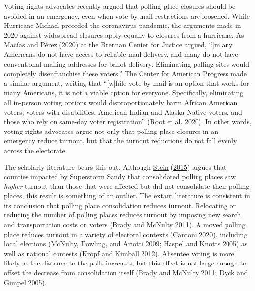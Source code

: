 \documentclass[
  12pt,
]{article}
\begin{document}
Voting rights advocates recently argued that polling place closures should be avoided in an emergency, even when vote-by-mail restrictions are loosened. While Hurricane Michael preceded the coronavirus pandemic, the arguments made in 2020 against widespread closures apply equally to closures from a hurricane. As \protect\hyperlink{ref-Macias2020}{Macías and Pérez} (\protect\hyperlink{ref-Macias2020}{2020}) at the Brennan Center for Justice argued, ``{[}m{]}any Americans do not have access to reliable mail delivery, and many do not have conventional mailing addresses for ballot delivery. Eliminating polling sites would completely disenfranchise these voters.'' The Center for American Progress made a similar argument, writing that ``{[}w{]}hile vote by mail is an option that works for many Americans, it is not a viable option for everyone. Specifically, eliminating all in-person voting options would disproportionately harm African American voters, voters with disabilities, American Indian and Alaska Native voters, and those who rely on same-day voter registration'' (\protect\hyperlink{ref-Root2020}{Root et al. 2020}). In other words, voting rights advocates argue not only that polling place closures in an emergency reduce turnout, but that the turnout reductions do not fall evenly across the electorate.

The scholarly literature bears this out. Although \protect\hyperlink{ref-Stein2015}{Stein} (\protect\hyperlink{ref-Stein2015}{2015}) argues that counties impacted by Superstorm Sandy that consolidated polling places saw \emph{higher} turnout than those that were affected but did not consolidate their polling places, this result is something of an outlier. The extant literature is consistent in its conclusion that polling place consolidation reduces turnout. Relocating or reducing the number of polling places reduces turnout by imposing new search and transportation costs on voters (\protect\hyperlink{ref-Brady2011}{Brady and McNulty 2011}). A moved polling place reduces turnout in a variety of electoral contexts (\protect\hyperlink{ref-Cantoni2020}{Cantoni 2020}), including local elections (\protect\hyperlink{ref-McNulty2009}{McNulty, Dowling, and Ariotti 2009}; \protect\hyperlink{ref-Haspel2005}{Haspel and Knotts 2005}) as well as national contests (\protect\hyperlink{ref-Kropf2012}{Kropf and Kimball 2012}). Absentee voting is more likely as the distance to the polls increases, but this effect is not large enough to offset the decrease from consolidation itself (\protect\hyperlink{ref-Brady2011}{Brady and McNulty 2011}; \protect\hyperlink{ref-Dyck2005}{Dyck and Gimpel 2005}).
\end{document}
